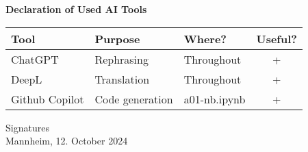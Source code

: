 \documentclass[a4paper,oneside,bibliography=totoc]{scrartcl}
\begin{document}
\begin{center}
  \textbf{Declaration of Used AI Tools} \\[.3em]
  \begin{tabularx}{\textwidth}{lXlc}
    \toprule
    Tool & Purpose & Where? & Useful? \\
    \midrule
    ChatGPT & Rephrasing & Throughout & + \\
    DeepL & Translation & Throughout & + \\
    Github Copilot & Code generation & a01-nb.ipynb & + \\
    \bottomrule
  \end{tabularx}
\end{center}

\vspace{2cm}
\noindent Signatures\\
\noindent Mannheim, 12. October 2024 \hfill
\end{document}
